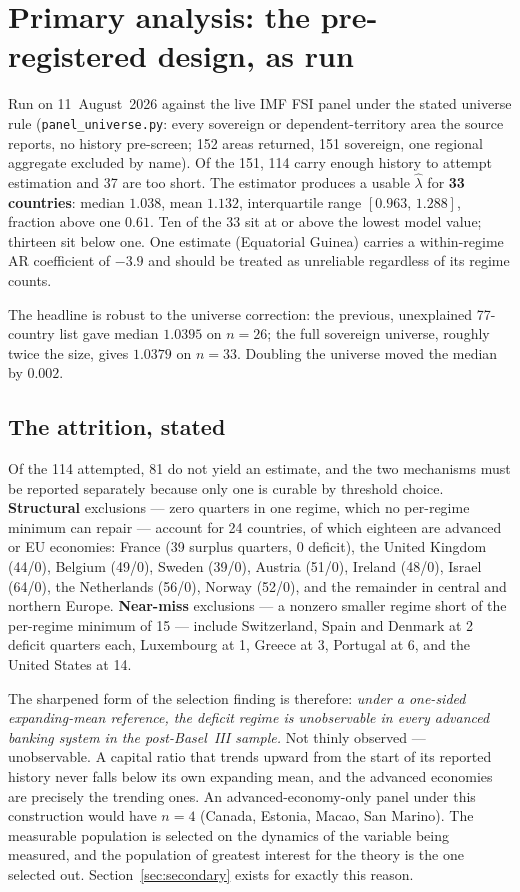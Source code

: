 \documentclass[11pt]{article}
\begin{document}
\section{Primary analysis: the pre-registered design, as run}
\label{sec:primary}

Run on 11~August~2026 against the live IMF FSI panel under the stated
universe rule (\texttt{panel\_universe.py}: every sovereign or
dependent-territory area the source reports, no history pre-screen;
152 areas returned, 151 sovereign, one regional aggregate excluded by
name). Of the 151, 114 carry enough history to attempt estimation and 37
are too short. The estimator produces a usable $\hat\lambda$ for
\textbf{33 countries}: median $\mathbf{1.038}$, mean $1.132$, interquartile
range $[0.963,\,1.288]$, fraction above one $0.61$. Ten of the 33 sit at
or above the lowest model value; thirteen sit below one. One estimate
(Equatorial Guinea) carries a within-regime AR coefficient of $-3.9$ and
should be treated as unreliable regardless of its regime counts.

The headline is robust to the universe correction: the previous,
unexplained 77-country list gave median $1.0395$ on $n=26$; the full
sovereign universe, roughly twice the size, gives $1.0379$ on $n=33$.
Doubling the universe moved the median by $0.002$.

\subsection{The attrition, stated}

Of the 114 attempted, 81 do not yield an estimate, and the two mechanisms
must be reported separately because only one is curable by threshold
choice. \textbf{Structural} exclusions --- zero quarters in one regime,
which no per-regime minimum can repair --- account for 24 countries, of
which eighteen are advanced or EU economies: France (39 surplus quarters,
0 deficit), the United Kingdom (44/0), Belgium (49/0), Sweden (39/0),
Austria (51/0), Ireland (48/0), Israel (64/0), the Netherlands (56/0),
Norway (52/0), and the remainder in central and northern Europe.
\textbf{Near-miss} exclusions --- a nonzero smaller regime short of the
per-regime minimum of 15 --- include Switzerland, Spain and Denmark at 2
deficit quarters each, Luxembourg at 1, Greece at 3, Portugal at 6, and
the United States at 14.

The sharpened form of the selection finding is therefore: \emph{under a
one-sided expanding-mean reference, the deficit regime is unobservable in
every advanced banking system in the post-Basel~III sample.} Not thinly
observed --- unobservable. A capital ratio that trends upward from the
start of its reported history never falls below its own expanding mean,
and the advanced economies are precisely the trending ones. An
advanced-economy-only panel under this construction would have $n=4$
(Canada, Estonia, Macao, San Marino). The measurable population is
selected on the dynamics of the variable being measured, and the
population of greatest interest for the theory is the one selected out.
Section~\ref{sec:secondary} exists for exactly this reason.
\end{document}
